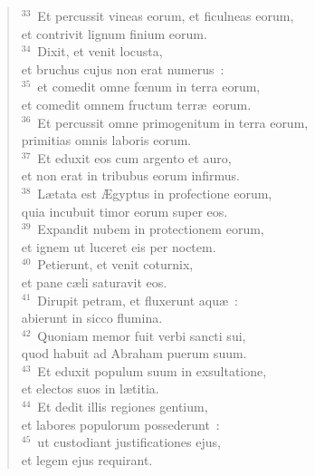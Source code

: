 \begin{flushleft}
\begin{verse}
${}^{33}$~Et percussit vineas eorum, et ficulneas eorum,\\ et contrivit lignum finium eorum.\\
${}^{34}$~Dixit, et venit locusta,\\ et bruchus cujus non erat numerus~:\\
${}^{35}$~et comedit omne fœnum in terra eorum,\\ et comedit omnem fructum terr\ae\ eorum.\\
${}^{36}$~Et percussit omne primogenitum in terra eorum,\\ primitias omnis laboris eorum.\\
${}^{37}$~Et eduxit eos cum argento et auro,\\ et non erat in tribubus eorum infirmus.\\
${}^{38}$~L\ae tata est \AE gyptus in profectione eorum,\\ quia incubuit timor eorum super eos.\\
${}^{39}$~Expandit nubem in protectionem eorum,\\ et ignem ut luceret eis per noctem.\\
${}^{40}$~Petierunt, et venit coturnix,\\ et pane c\ae li saturavit eos.\\
${}^{41}$~Dirupit petram, et fluxerunt aqu\ae~:\\ abierunt in sicco flumina.\\
${}^{42}$~Quoniam memor fuit verbi sancti sui,\\ quod habuit ad Abraham puerum suum.\\
${}^{43}$~Et eduxit populum suum in exsultatione,\\ et electos suos in l\ae titia.\\
${}^{44}$~Et dedit illis regiones gentium,\\ et labores populorum possederunt~:\\
${}^{45}$~ut custodiant justificationes ejus,\\ et legem ejus requirant.\end{verse}\end{flushleft}


